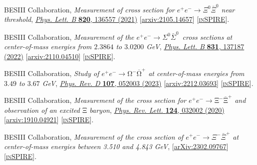 \documentclass[a4paper,11pt]{article}
\begin{document}
\begin{thebibliography}{**}
BESIII Collaboration,
\textit{Measurement of cross section for $e^{+}e^{-}\rightarrow\Xi^{0}\bar{\Xi}^{0}$ near threshold},
\href{https://www.sciencedirect.com/science/article/pii/S0370269321004974?via%3Dihub}{\textit{Phys. Lett. B} \textbf{820}, 136557 (2021)}
[\textcolor{blue}{\href{https://arxiv.org/pdf/2105.14657.pdf}{arxiv:2105.14657}}] 
[\textcolor{blue}{\href{https://inspirehep.net/literature/1866233}{\textsc{inSPIRE}}}].

BESIII Collaboration,
\textit{Measurement of the $e^{+}e^{-}\to\Sigma^{0}\bar{\Sigma}^{0}$~cross sections at center-of-mass energies from $2.3864$ to $3.0200$ GeV}, 
\href{https://www.sciencedirect.com/science/article/pii/S0370269322003215?via%3Dihub}{\textit{Phys. Lett. B} \textbf{831}, 137187 (2022)}
[\textcolor{blue}{\href{https://arxiv.org/pdf/2110.04510.pdf}{arxiv:2110.04510}}] 
[\textcolor{blue}{\href{https://inspirehep.net/literature/1940960}{\textsc{inSPIRE}}}].

BESIII Collaboration,
\textit{Study of ${e}^{+}{e}^{\ensuremath{-}}\ensuremath{\rightarrow}{\mathrm{\ensuremath{\Omega}}}^{\ensuremath{-}}{\overline{\mathrm{\ensuremath{\Omega}}}}^{+}$ at center-of-mass energies from $3.49$ to $3.67$ GeV},
\href{https://journals.aps.org/prd/abstract/10.1103/PhysRevD.107.052003}{\textit{Phys. Rev. D} \textbf{107}, 052003 (2023)}
[\textcolor{blue}{\href{https://arxiv.org/pdf/2212.03693.pdf}{arxiv:2212.03693}}] 
[\textcolor{blue}{\href{https://inspirehep.net/literature/2611486}{\textsc{inSPIRE}}}].

BESIII Collaboration,
\textit{Measurement of the cross section for ${e}^{+}{e}^{\ensuremath{-}}\ensuremath{\rightarrow}{\mathrm{\ensuremath{\Xi}}}^{\ensuremath{-}}{\overline{\mathrm{\ensuremath{\Xi}}}}^{+}$ and observation of an excited $\mathrm{\ensuremath{\Xi}}$ baryon},
\href{https://journals.aps.org/prl/abstract/10.1103/PhysRevLett.124.032002}{\textit{Phys. Rev. Lett.} \textbf{124}, 032002 (2020)}
[\textcolor{blue}{\href{https://arxiv.org/pdf/1910.04921.pdf}{arxiv:1910.04921}}] 
[\textcolor{blue}{\href{https://inspirehep.net/literature/1758883}{\textsc{inSPIRE}}}].

BESIII Collaboration,
\textit{Measurement of the cross section of $e^+e^-\rightarrow\Xi^{-}\bar\Xi^{+}$ at center-of-mass energies between 3.510 and 4.843 GeV}, 
[\textcolor{blue}{\href{https://arxiv.org/abs/2309.04215}{arXiv:2302.09767}}] 
[\textcolor{blue}{\href{https://inspirehep.net/literature?sort=mostrecent&size=25&page=1&q=2302.09767}{\textsc{inSPIRE}}}].


\end{thebibliography}
\end{document}
